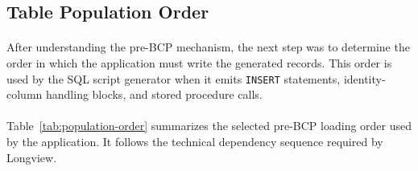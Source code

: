 \subsection{Table Population Order}

\paragraph{}After understanding the pre-BCP mechanism, the next step was to determine the order
in which the application must write the generated records. This order is used by the SQL script
generator when it emits \texttt{INSERT} statements, identity-column handling blocks, and stored
procedure calls.

\paragraph{}Table~\ref{tab:population-order} summarizes the selected pre-BCP loading order used
by the application. It follows the technical dependency sequence required by Longview.

